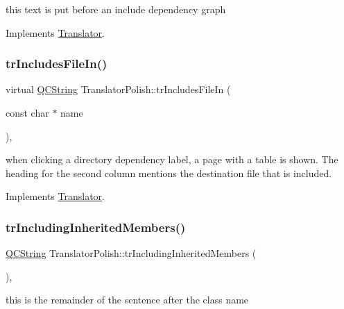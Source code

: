 this text is put before an include dependency graph 

Implements \mbox{\hyperlink{class_translator}{Translator}}.

\mbox{\label{class_translator_polish_a196990beb57f0e7f40361357311205f2}} 
\subsubsection{\texorpdfstring{trIncludesFileIn()}{trIncludesFileIn()}}
{\footnotesize\ttfamily virtual \mbox{\hyperlink{class_q_c_string}{Q\+C\+String}} Translator\+Polish\+::tr\+Includes\+File\+In (\begin{DoxyParamCaption}\item[{const char $\ast$}]{name }\end{DoxyParamCaption})\hspace{0.3cm}{\ttfamily [inline]}, {\ttfamily [virtual]}}

when clicking a directory dependency label, a page with a table is shown. The heading for the second column mentions the destination file that is included. 

Implements \mbox{\hyperlink{class_translator}{Translator}}.

\mbox{\label{class_translator_polish_a1a4e6470756f228d2393106764fd72bb}} 
\subsubsection{\texorpdfstring{trIncludingInheritedMembers()}{trIncludingInheritedMembers()}}
{\footnotesize\ttfamily \mbox{\hyperlink{class_q_c_string}{Q\+C\+String}} Translator\+Polish\+::tr\+Including\+Inherited\+Members (\begin{DoxyParamCaption}{ }\end{DoxyParamCaption})\hspace{0.3cm}{\ttfamily [inline]}, {\ttfamily [virtual]}}

this is the remainder of the sentence after the class name 

